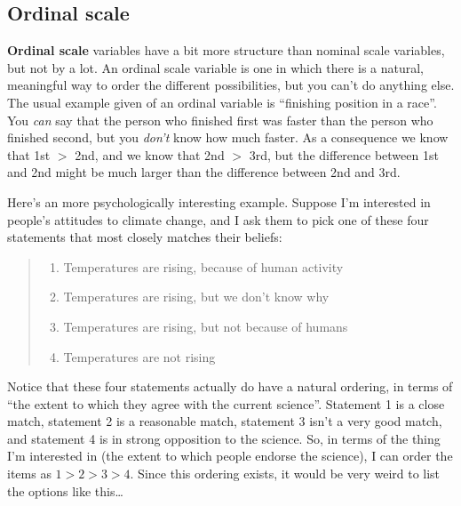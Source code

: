 \documentclass[
]{book}
\providecommand{\tightlist}{%
  \setlength{\itemsep}{0pt}\setlength{\parskip}{0pt}}
\begin{document}
\hypertarget{ordinal-scale}{%
\subsection{Ordinal scale}\label{ordinal-scale}}

\textbf{Ordinal scale} variables have a bit more structure than nominal scale variables, but not by a lot. An ordinal scale variable is one in which there is a natural, meaningful way to order the different possibilities, but you can't do anything else. The usual example given of an ordinal variable is ``finishing position in a race''. You {\emph{can}} say that the person who finished first was faster than the person who finished second, but you {\emph{don't}} know how much faster. As a consequence we know that 1st \(>\) 2nd, and we know that 2nd \(>\) 3rd, but the difference between 1st and 2nd might be much larger than the difference between 2nd and 3rd.

Here's an more psychologically interesting example. Suppose I'm interested in people's attitudes to climate change, and I ask them to pick one of these four statements that most closely matches their beliefs:

\begin{quote}
\begin{enumerate}
\def\labelenumi{(\arabic{enumi})}
\tightlist
\item
  Temperatures are rising, because of human activity\\
\item
  Temperatures are rising, but we don't know why\\
\item
  Temperatures are rising, but not because of humans\\
\item
  Temperatures are not rising
\end{enumerate}
\end{quote}

Notice that these four statements actually do have a natural ordering, in terms of ``the extent to which they agree with the current science''. Statement 1 is a close match, statement 2 is a reasonable match, statement 3 isn't a very good match, and statement 4 is in strong opposition to the science. So, in terms of the thing I'm interested in (the extent to which people endorse the science), I can order the items as \(1 > 2 > 3 > 4\). Since this ordering exists, it would be very weird to list the options like this\ldots{}
\end{document}

